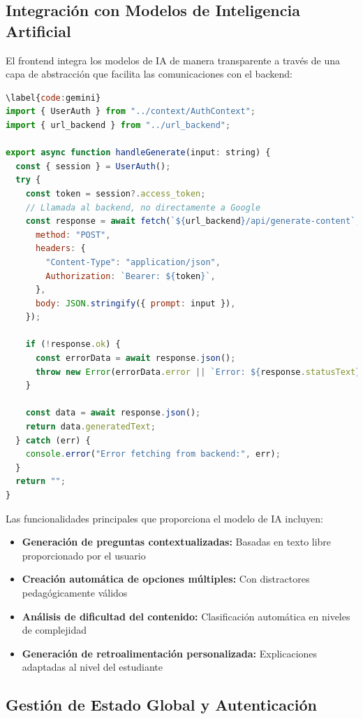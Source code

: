\documentclass[12pt,a4paper]{report}
\begin{document}
\subsection{Integración con Modelos de Inteligencia Artificial}

El frontend integra los modelos de IA de manera transparente a través de una capa de abstracción que facilita las comunicaciones con el backend:

\begin{lstlisting}[language=JavaScript, caption={Código \ref{code:gemini}: Integración con Gemini AI}]
\label{code:gemini}
import { UserAuth } from "../context/AuthContext";
import { url_backend } from "../url_backend";

export async function handleGenerate(input: string) {
  const { session } = UserAuth();
  try {
    const token = session?.access_token;
    // Llamada al backend, no directamente a Google
    const response = await fetch(`${url_backend}/api/generate-content`, {
      method: "POST",
      headers: {
        "Content-Type": "application/json",
        Authorization: `Bearer: ${token}`,
      },
      body: JSON.stringify({ prompt: input }),
    });

    if (!response.ok) {
      const errorData = await response.json();
      throw new Error(errorData.error || `Error: ${response.statusText}`);
    }

    const data = await response.json();
    return data.generatedText;
  } catch (err) {
    console.error("Error fetching from backend:", err);
  }
  return "";
}
\end{lstlisting}

Las funcionalidades principales que proporciona el modelo de IA incluyen:

\begin{itemize}
\item \textbf{Generación de preguntas contextualizadas:} Basadas en texto libre proporcionado por el usuario
\item \textbf{Creación automática de opciones múltiples:} Con distractores pedagógicamente válidos
\item \textbf{Análisis de dificultad del contenido:} Clasificación automática en niveles de complejidad
\item \textbf{Generación de retroalimentación personalizada:} Explicaciones adaptadas al nivel del estudiante
\end{itemize}

\subsection{Gestión de Estado Global y Autenticación}
\end{document}
